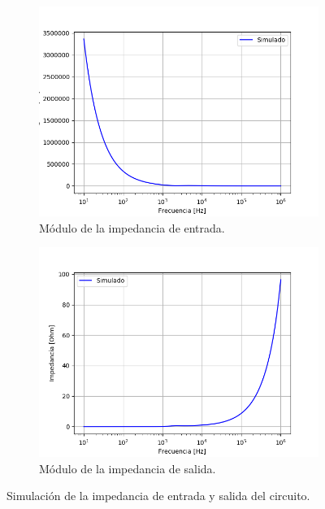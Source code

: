 \begin{figure}[H]
	\centering
	\begin{subfigure}[t]{0.49\textwidth}
	\hspace*{-2cm}
	\centering
		\includegraphics[width=1.1\textwidth]{Imagenes/sim_zin.png}
		\caption{Módulo de la impedancia de entrada.}
	\end{subfigure}
	\begin{subfigure}[t]{0.49\textwidth}
	\centering
		\includegraphics[width=1.1\textwidth]{Imagenes/sim_zout.png}
		\caption{Módulo de la impedancia de salida.}
	\end{subfigure}
	\label{fig:zin_zout}
	\caption{Simulación de la impedancia de entrada y salida del circuito.}
\end{figure}

